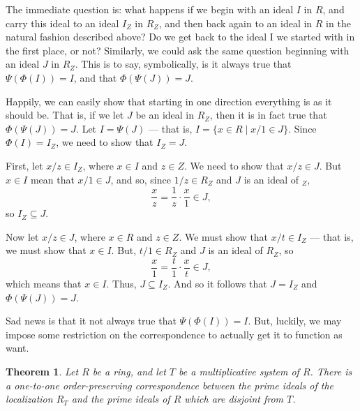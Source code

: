 \documentclass[12pt,reqno]{amsart}
\theoremstyle{plain}
\newtheorem{theorem}{Theorem}
\begin{document}
The immediate question is: what happens if we begin with an ideal $I$ in $R$, and carry this ideal to an ideal $I_Z$ in $R_Z$, and then back again to an ideal in $R$ in the natural fashion described above? Do we get back to the ideal I we started with in the first place, or not? Similarly, we could ask the same question beginning with an
ideal $J$ in $R_Z$. This is to say, symbolically, is it always true that $\Psi ( \Phi (I)) = I$, and that $\Phi (\Psi (J)) = J$.

Happily, we can easily show that starting in one direction everything is as it should be. That is, if we let $J$ be an ideal in $R_Z$, then it is in fact true that $\Phi (\Psi (J)) = J$. Let $I = \Psi (J)$ — that is, $I = \{ x \in R \mid x/1 \in J \}$. Since $\Phi (I) = I_Z$, we need to show that $I_Z = J$.

First, let $x/z \in I_Z$, where $x \in I$ and $z \in Z$. We need to show that $x/z \in J$. But $x \in I$ mean that $x/1 \in J$, and so, since $1/ z \in R_Z$ and $J$ is an ideal of $_Z$, 
\[
\frac{x}{z} = \frac{1}{z} \cdot \frac{x}{1} \in J,
\]
so $I_Z \subseteq J$.

Now let $x/z \in J$, where $x \in R$ and $z \in Z$. We must show that $x/t \in I_Z$ — that is, we must show that $x \in I$. But, $t/1 \in R_Z$ and $J$ is an ideal of $R_Z$, so
\[
\frac{x}{1} = \frac{t}{1} \cdot \frac{x}{t} \in J,
\]
which means that $x \in I$. Thus, $J \subseteq I_Z$. And so it follows that $J = I_Z$ and $\Phi (\Psi (J)) = J$. 

Sad news is that it not always true that $\Psi (\Phi (I)) = I$. But, luckily, we may impose some restriction on the correspondence to actually get it to function as want. 
\begin{theorem}
Let $R$ be a ring, and let $T$ be a multiplicative system of $R$. There is a one-to-one order-preserving correspondence between the prime ideals of the localization $R_T$ and the prime ideals of $R$ which are disjoint from $T$.
\end{theorem}
\end{document}
